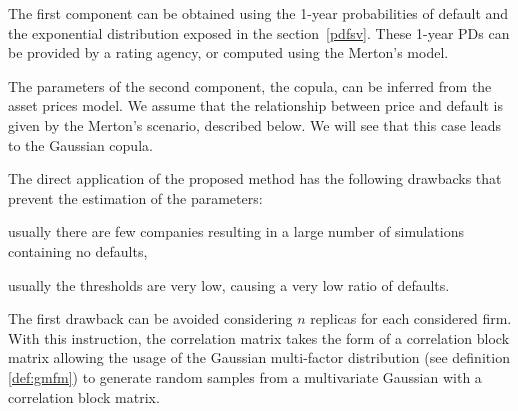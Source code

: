\documentclass[11pt,fleqn]{book} %
\begin{document}
The first component can be obtained using the 1-year probabilities of default 
and the exponential distribution exposed in the section~\ref{pdfsv}. These 
1-year PDs can be provided by a rating agency, or computed using the Merton's 
model.

The parameters of the second component, the copula, can be inferred from the 
asset prices model. We assume that the relationship between price and default 
is given by the Merton's scenario, described below. We will see that this case 
leads to the Gaussian copula.

The direct application of the proposed method has the following drawbacks
that prevent the estimation of the parameters:
\begin{inparaenum}[1)]
	\item usually there are few companies resulting in a large number of 
	simulations containing no defaults,
	\item usually the thresholds are very low, causing a very low ratio of 
	defaults.
\end{inparaenum}

The first drawback can be avoided considering $n$ replicas for each considered
firm. With this instruction, the correlation matrix takes the form of a 
correlation block matrix allowing the usage of the Gaussian multi-factor 
distribution (see definition \ref{def:gmfm}) to generate random samples from 
a multivariate Gaussian with a correlation block matrix.
\end{document}
